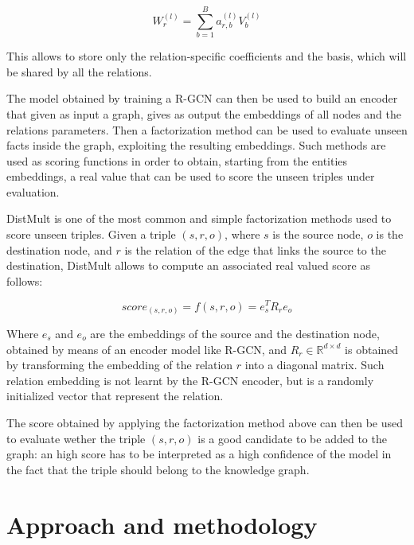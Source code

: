 \documentclass[%
    corpo=13.5pt,
    twoside,
    oldstyle,
    tipotesi=magistrale,
    greek,
    evenboxes
]{toptesi}
\begin{document}
\begin{equation}
    W_r^{(l)} = \sum_{b=1}^B a_{r,b}^{(l)} V_b^{(l)}
\end{equation}

This allows to store only the relation-specific coefficients and the basis,
which will be shared by all the relations.

The model obtained by training a R-GCN can then be used to build an encoder
that given as input a graph, gives as output the embeddings of all nodes and
the relations parameters. Then a factorization method can be used to
evaluate unseen facts inside the graph, exploiting the resulting embeddings.
Such methods are used as scoring functions in order to obtain, starting from
the entities embeddings, a real value that can be used to score the unseen
triples under evaluation.
\newline

DistMult \cite{yang2014} is one of the most common and simple factorization
methods used to score unseen triples. Given a triple $(s, r, o)$, where $s$
is the source node, $o$ is the destination node, and $r$ is the relation of the
edge that links the source to the destination, DistMult allows to compute
an associated real valued score as follows:

\begin{equation}
    score_{(s,r,o)} = f(s,r,o) = e_s^T R_r e_o
\end{equation}

Where $e_s$ and $e_o$ are the embeddings of the source and the destination node,
obtained by means of an encoder model like R-GCN, and
$R_r\in\mathbb{R}^{d \times d}$ is obtained by transforming the embedding
of the relation $r$ into a diagonal matrix. Such relation embedding is not
learnt by the R-GCN encoder, but is a randomly initialized vector that
represent the relation.

The score obtained by applying the factorization method above can then be used
to evaluate wether the triple $(s,r,o)$ is a good candidate to be added to the
graph: an high score has to be interpreted as a high confidence of the model
in the fact that the triple should belong to the knowledge graph.



\chapter{Approach and methodology}
\label{ch:approach}
\end{document}
